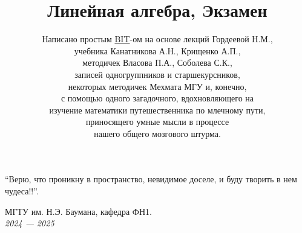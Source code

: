 \documentclass[a4papper]{article}
\title{\Huge Линейная алгебра, Экзамен}
\author{
    Написано простым \href{https://t.me/Borislav_Timoshin}{BIT}-ом на основе лекций Гордеевой Н.М., \\ 
    учебника Канатникова А.Н., Крищенко А.П., \\
    методичек Власова П.А., Соболева С.К., \\
    записей одногруппников и старшекурсников,\\ некоторых методичек Мехмата МГУ и, конечно, \\ с помощью одного загадочного, вдохновляющего на \\ изучение математики путешественника по млечному пути, \\
    приносящего умные мысли в процессе \\
    нашего общего мозгового штурма. 
}
\date{} %
\begin{document}
    \pagestyle{fancy}
    \fancyhead[L]{\thepage}

    \maketitle

    \epigraph{
        ``Верю, что проникну в пространство, невидимое доселе, и буду творить в нем чудеса!!''.
    }{}


    \vfill %

    \begin{center}
        \Large МГТУ им. Н.Э. Баумана, кафедра ФН1. \\
        \emph{2024 — 2025}
    \end{center}

    \newpage
        
    \tableofcontents

    \Hide
    

    
    
    
    
    
    
    
    
    
    
    
    
    
    
    
    
    
    
    
    

    
    
    
    
    
    
    
    
    
    
    
    
    
    
    
    
    
    
    
    
\end{document}
